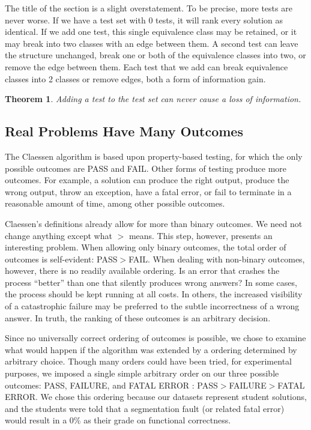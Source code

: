 \documentclass[11pt,twoside]{article}
\newtheorem{thm}{Theorem}
\theoremstyle{definition}
\begin{document}
The title of the section is a slight overstatement. To be precise, more tests are never worse. If we have a test set with 0 tests, it will rank every solution as identical. If we add one test, this single equivalence class may be retained, or it may break into two classes with an edge between them. A second test can leave the structure unchanged, break one or both of the equivalence classes into two, or remove the edge between them. Each test that we add can break equivalence classes into 2 classes or remove edges, both a form of information gain.


\begin{thm} Adding a test to the test set can never cause a loss of information.
\end{thm}

\subsection{Real Problems Have Many Outcomes}
The Claessen algorithm is based upon property-based testing, for which the only possible outcomes are PASS and FAIL. Other forms of testing produce more outcomes. For example, a solution can produce the right output, produce the wrong output, throw an exception, have a fatal error, or fail to terminate in a reasonable amount of time, among other possible outcomes.

Claessen's definitions already allow for more than binary outcomes. We need not change anything except what $>$ means. This step, however, presents an interesting problem. When allowing only binary outcomes, the total order of outcomes is self-evident: PASS$>$FAIL. When dealing with non-binary outcomes, however, there is no readily available ordering. Is an error that crashes the process ``better'' than one that silently produces wrong answers? In some cases, the process should be kept running at all costs. In others, the increased visibility of a catastrophic failure may be preferred to the subtle incorrectness of a wrong answer. In truth, the ranking of these outcomes is an arbitrary decision.

Since no universally correct ordering of outcomes is possible, we chose to examine what would happen if the algorithm was extended by a ordering determined by arbitrary choice. Though many orders could have been tried, for experimental purposes, we imposed a single simple arbitrary order on our three possible outcomes: PASS, FAILURE, and FATAL ERROR : PASS$>$FAILURE$>$FATAL ERROR. We chose this ordering because our datasets represent student solutions, and the students were told that a segmentation fault (or related fatal error) would result in a 0\% as their grade on functional correctness.
\end{document}
